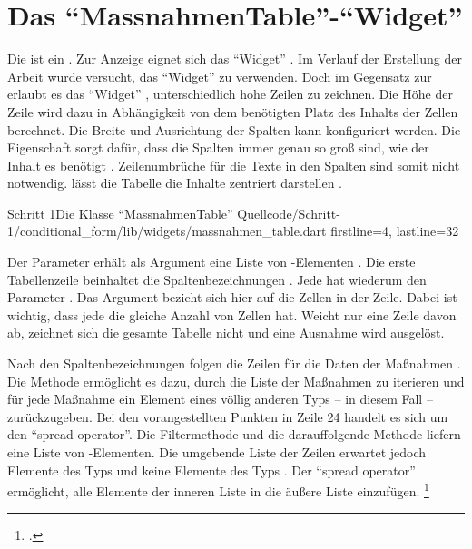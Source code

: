 
\ifodd\value{page}\hbox{}\newpage\fi
\section{Das \enquote{MassnahmenTable}-\enquote{Widget}}

Die  ist ein   .
Zur Anzeige eignet sich das \enquote{Widget}  . Im Verlauf der Erstellung der Arbeit wurde versucht, das \enquote{Widget}  zu verwenden.
Doch im Gegensatz zur  erlaubt es das \enquote{Widget} , unterschiedlich hohe Zeilen zu zeichnen.
Die Höhe der Zeile wird dazu in Abhängigkeit von dem benötigten Platz des Inhalts der Zellen berechnet.
Die Breite und Ausrichtung der Spalten kann konfiguriert werden.
Die Eigenschaft  sorgt dafür,
dass die Spalten immer genau so groß sind,
wie der Inhalt es benötigt . 
Zeilenumbrüche für die Texte in den Spalten sind somit nicht notwendig.
 lässt die  Tabelle die Inhalte zentriert darstellen .


\begin{alexlisting}{Schritt 1}{Die Klasse \enquote{MassnahmenTable}}
    {Quellcode/Schritt-1/conditional_form/lib/widgets/massnahmen_table.dart}
    {firstline=4, lastline=32}
    \label{lst:Schritt1KlasseMassnahmenTable}
  \end{alexlisting}

Der Parameter  erhält als Argument eine Liste von -Elementen .
Die erste Tabellenzeile beinhaltet die Spaltenbezeichnungen .
Jede  hat wiederum den Parameter .
Das Argument bezieht sich hier auf die Zellen in der Zeile.
Dabei ist wichtig, dass jede  die gleiche Anzahl von Zellen hat.
Weicht nur eine Zeile davon ab, zeichnet sich die gesamte Tabelle nicht und eine Ausnahme wird ausgelöst.

\clearpage
Nach den Spaltenbezeichnungen folgen die Zeilen für die Daten der Maßnahmen .
Die Methode   ermöglicht es dazu, durch die Liste der Maßnahmen zu iterieren und für jede Maßnahme ein Element eines völlig anderen Typs -- in diesem Fall  -- zurückzugeben.
Bei den vorangestellten Punkten  in Zeile 24 handelt es sich um den \enquote{spread operator}.
Die Filtermethode  und die darauffolgende Methode  liefern eine Liste von -Elementen.
Die umgebende Liste der Zeilen   erwartet jedoch Elemente des Typs  und keine Elemente des Typs .
Der \enquote{spread operator} ermöglicht,
alle Elemente der inneren Liste in die äußere Liste einzufügen. \footcite[Vgl.][]{SpreadOperator}



